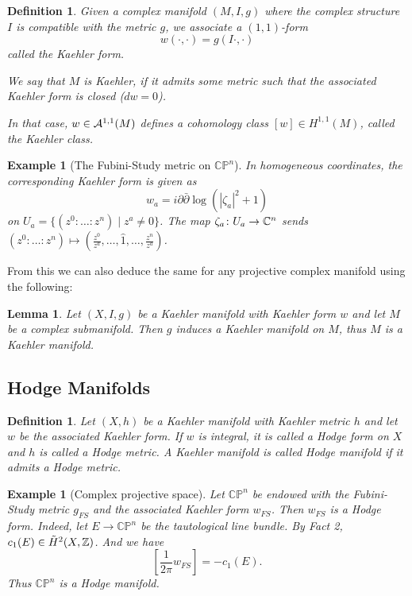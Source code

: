\documentclass[A4paper, british, reqno]{amsart}
\theoremstyle{darkgreentheorem}
\newtheorem{lm}[thm]{Lemma}
\theoremstyle{darkbluedefinition}
\newtheorem{defn}[thm]{Definition}
\theoremstyle{darkredexample}
\newtheorem{exa}[thm]{Example}
\theoremstyle{remark}
\newcommand{\CP}{\mathbb{CP}}
\newcommand{\1}{\mathbbm{1}}
\begin{document}
\begin{defn}
    Given a complex manifold $(M,I,g)$ where the complex structure $I$ is compatible with the metric $g$, we associate a $(1,1)$-form
    \[ w(\cdot,\cdot)=g(I\cdot,\cdot) \]
    called the \textit{Kaehler form}.

    We say that $M$ is Kaehler, if it admits some metric such that the associated Kaehler form is closed ($dw=0$).

    In that case, $w\in \mathcal{A}^{1,1}(M)$ defines a cohomology class $[w]\in H^{1,1}(M)$, called the \textit{Kaehler class}.
\end{defn}

\begin{exa}[The Fubini-Study metric on $\CP^{n}$]
    In homogeneous coordinates, the corresponding Kaehler form is given as
    \[ w_{a}=i\partial \bar{\partial}\log(|\zeta_{a}|^{2}+1) \]
    on $U_{a}=\{(z^{0}:\ldots:z^{n})\mid z^{a}\neq 0\}$.
    The map $\zeta_{a}\colon U_{a}\to \mathbb{C}^{n}$ sends $(z^{0}:\ldots:z^{n})\mapsto (\frac{z^{0}}{z^{a}},\ldots,\hat{1},\ldots,\frac{z^{n}}{z^{a}})$.
\end{exa}

From this we can also deduce the same for any projective complex manifold using the following:

\begin{lm}
    Let $(X,I,g)$ be a Kaehler manifold with Kaehler form $w$ and let $M$ be a complex submanifold.
    Then $g$ induces a Kaehler manifold on $M$, thus $M$ is a Kaehler manifold.
\end{lm}

\subsection{Hodge Manifolds}

\begin{defn}
    Let $(X,h)$ be a Kaehler manifold with Kaehler metric $h$ and let $w$ be the associated Kaehler form.
    If $w$ is integral, it is called a \textit{Hodge form} on $X$ and $h$ is called a \textit{Hodge metric}.
    A Kaehler manifold is called \textit{Hodge manifold} if it admits a Hodge metric.
\end{defn}

\begin{exa}[Complex projective space]
    Let $\CP^{n}$ be endowed with the Fubini-Study metric $g_{FS}$ and the associated Kaehler form $w_{FS}$.
    Then $w_{FS}$ is a Hodge form.
    Indeed, let $E\to \CP^{n}$ be the tautological line bundle.
    By Fact 2, $c_{1}(E)\in \tilde{H}^{2}(X,\mathbb{Z})$.
    And we have
    \[ \left[\frac{1}{2\pi} w_{FS}\right] =-c_{1}(E).\]
    Thus $\CP^{n}$ is a Hodge manifold.
\end{exa}
\end{document}
